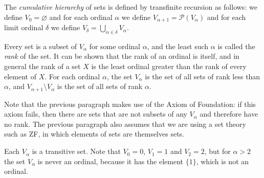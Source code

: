 \documentclass[12pt]{article}
\begin{document}
The \emph{cumulative hierarchy} of sets
is defined by transfinite recursion as follows:
we define $V_0=\varnothing$
and for each ordinal $\alpha$ we define $V_{\alpha+1}=\mathcal{P}(V_\alpha)$
and for each limit ordinal $\delta$ we define
$V_\delta=\bigcup_{\alpha\in\delta}V_\alpha$.

Every set is a subset of $V_\alpha$ for some ordinal $\alpha$,
and the least such $\alpha$ is called the \emph{rank} of the set.
It can be shown that the rank of an ordinal is itself,
and in general the rank of a set $X$
is the least ordinal greater than the rank of every element of $X$.
For each ordinal $\alpha$,
the set $V_\alpha$ is the set of all sets of rank less than $\alpha$,
and $V_{\alpha+1}\setminus V_\alpha$ is the set of all sets of rank $\alpha$.

Note that the previous paragraph makes use of the Axiom of Foundation:
if this axiom fails,
then there are sets that are not subsets of any $V_\alpha$
and therefore have no rank.
The previous paragraph also assumes that we are using a set theory such as ZF,
in which elements of sets are themselves sets.

Each $V_\alpha$ is a transitive set.
Note that $V_0=0$, $V_1=1$ and $V_2=2$,
but for $\alpha>2$ the set $V_\alpha$ is never an ordinal,
because it has the element $\{1\}$, which is not an ordinal.
\end{document}
